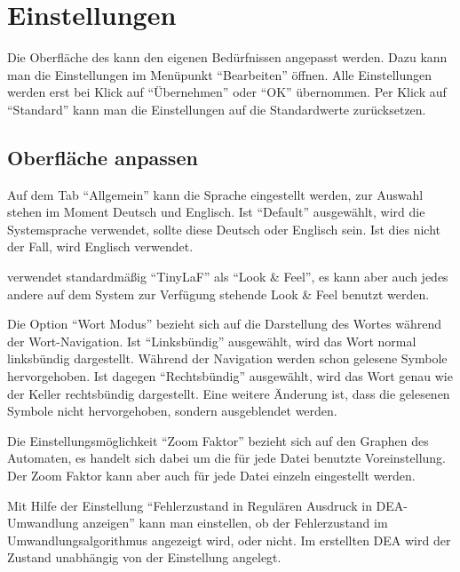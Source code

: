 

\chapter{Einstellungen}\label{Preferences}

Die Oberfläche des \gtitools kann den eigenen Bedürfnissen angepasst werden.
Dazu kann man die Einstellungen im Menüpunkt "`Bearbeiten"' öffnen. Alle
Einstellungen werden erst bei Klick auf "`Übernehmen"' oder "`OK"' übernommen.
Per Klick auf "`Standard"' kann man die Einstellungen auf die Standardwerte
zurücksetzen.


\section{Oberfläche anpassen}

Auf dem Tab "`Allgemein"' kann die Sprache eingestellt werden, zur Auswahl
stehen im Moment Deutsch und Englisch. Ist "`Default"' ausgewählt, wird
die Systemsprache verwendet, sollte diese Deutsch oder Englisch sein. Ist dies
nicht der Fall, wird Englisch verwendet.\vspace{10pt}

\gtitool verwendet standardmäßig "`TinyLaF"' als "`Look \& Feel"', es kann aber
auch jedes andere auf dem System zur Verfügung stehende Look \& Feel benutzt
werden.\vspace{10pt}

Die Option "`Wort Modus"' bezieht sich auf die Darstellung des Wortes während
der Wort-Navigation. Ist "`Linksbündig"' ausgewählt, wird das Wort normal
linksbündig dargestellt. Während der Navigation werden schon gelesene Symbole
hervorgehoben. Ist dagegen "`Rechtsbündig"' ausgewählt, wird das Wort genau wie
der Keller rechtsbündig dargestellt. Eine weitere Änderung ist, dass die
gelesenen Symbole nicht hervorgehoben, sondern ausgeblendet werden.\vspace{10pt}

Die Ein\-stell\-ungs\-möglich\-keit "`Zoom Faktor"' bezieht sich auf den Graphen
des Automaten, es handelt sich dabei um die für jede Datei benutzte
Voreinstellung. Der Zoom Faktor kann aber auch für jede Datei einzeln eingestellt
werden.\vspace{10pt}

Mit Hilfe der Einstellung "`Fehlerzustand in Regulären Ausdruck in DEA-Umwandlung anzeigen"' kann man einstellen, ob der Fehlerzustand im Umwandlungsalgorithmus angezeigt wird, oder nicht. Im erstellten DEA wird der Zustand unabhängig von der Einstellung angelegt.\vspace{10pt}

